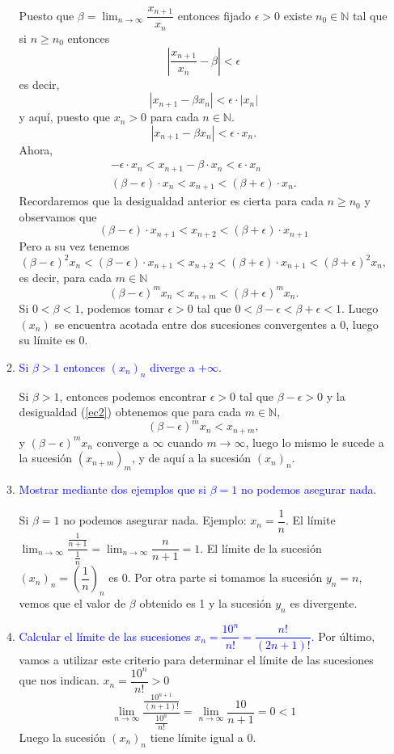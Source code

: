 \begin{enumerate}[label=\color{red}\textbf{\arabic*)}, leftmargin=*]
\begin{enumerate}[label=\color{red}\arabic*)]
			Puesto que $\beta=\lim_{n\to\infty}\dfrac{x_{n+1}}{x_n}$ entonces fijado $\epsilon>0$ existe $n_0\in\mathbb{N}$ tal que si $n\ge n_0$ entonces \[ \left|\dfrac{x_{n+1}}{x_n}-\beta\right| <\epsilon\] es decir, \[ |x_{n+1}-\beta x_n|<\epsilon\cdot|x_n| \] y aquí, puesto que $x_n>0$ para cada $n\in\mathbb{N}$. \[ |x_{n+1}-\beta x_n|<\epsilon\cdot x_n. \]
		Ahora, \[ \begin{array}{c}
			-\epsilon\cdot x_n<x_{n+1}-\beta\cdot x_n<\epsilon\cdot x_n\\
			(\beta-\epsilon)\cdot x_n<x_{n+1}<(\beta+\epsilon)\cdot x_n.
		\end{array} \] Recordaremos que la desigualdad anterior es cierta para cada $n\ge n_0$ y observamos que \[ (\beta-\epsilon)\cdot x_{n+1}<x_{n+2}<(\beta+\epsilon)\cdot x_{n+1} \] Pero a su vez tenemos \[ (\beta-\epsilon)^2x_n<(\beta-\epsilon)\cdot x_{n+1}<x_{n+2}<(\beta+\epsilon)\cdot x_{n+1}<(\beta+\epsilon)^2x_n, \] es decir, para cada $m\in \mathbb{N}$  \begin{equation}\label{ec2}
			(\beta-\epsilon)^mx_n<x_{n+m}<(\beta+\epsilon)^mx_n. 
		\end{equation}
		Si $0<\beta<1$, podemos tomar $\epsilon>0$ tal que $0<\beta-\epsilon<\beta+\epsilon<1$. Luego $(x_n)$ se encuentra acotada entre dos sucesiones convergentes a 0, luego su límite es 0.
		\item \textcolor{blue}{Si $\beta>1$ entonces $(x_n)_n$ diverge a $+\infty$.}
		
			Si $\beta>1$, entonces podemos encontrar $\epsilon>0$ tal que $\beta-\epsilon>0$ y la desigualdad (\ref{ec2}) obtenemos que para cada $m\in\mathbb{N}$, \[ (\beta-\epsilon)^mx_n<x_{n+m}, \] y $(\beta-\epsilon)^mx_n$ converge a $\infty$ cuando $m\to\infty$, luego lo mismo le sucede a la sucesión $(x_{n+m})_{m}$, y de aquí a la sucesión $(x_n)_n$.
		\item \textcolor{blue}{Mostrar mediante dos ejemplos que si $\beta=1$ no podemos asegurar nada.}
		
			Si $\beta=1$ no podemos asegurar nada. Ejemplo: $x_n=\dfrac{1}{n}$. El límite $\lim_{n\to\infty}\dfrac{\frac{1}{n+1}}{\frac{1}{n}}=\lim_{n\to\infty}\dfrac{n}{n+1}=1$. El límite de la sucesión $(x_n)_n=\left(\dfrac{1}{n}\right)_n$ es 0. Por otra parte si tomamos la sucesión $y_n=n$, vemos que el valor de $\beta$ obtenido es 1 y la sucesión $y_n$ es divergente.
		\item \textcolor{blue}{Calcular el límite de las sucesiones $x_n=\dfrac{10^n}{n!}=\dfrac{n!}{(2n+1)!}$.}
		Por último, vamos a utilizar este criterio para determinar el límite de las sucesiones que nos indican. 
		$x_n=\dfrac{10^n}{n!}>0$ \[ \lim_{n\to\infty}\dfrac{\frac{10^{n+1}}{(n+1)!}}{\frac{10^n}{n!}}=\lim_{n\to\infty}\dfrac{10}{n+1}=0<1 \] Luego la sucesión $(x_n)_n$ tiene límite igual a 0.
		

\end{enumerate}
\end{enumerate}

